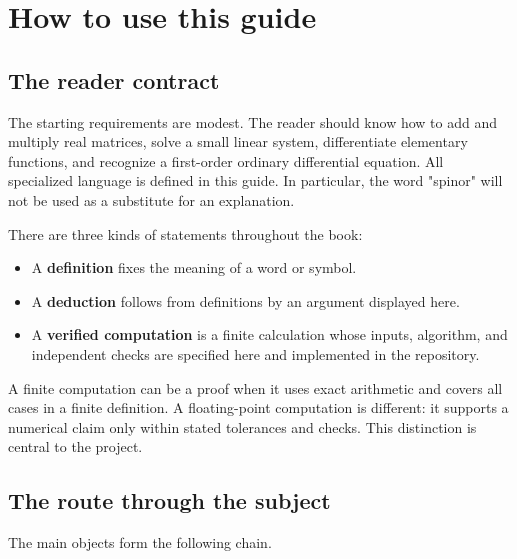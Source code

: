 \documentclass[11pt]{article}
\begin{document}
\section{How to use this guide}

\subsection{The reader contract}

The starting requirements are modest. The reader should know how to add and multiply real matrices, solve a small linear system, differentiate elementary functions, and recognize a first-order ordinary differential equation. All specialized language is defined in this guide. In particular, the word "spinor" will not be used as a substitute for an explanation.

There are three kinds of statements throughout the book:

\begin{itemize}
\item A \textbf{definition} fixes the meaning of a word or symbol.
\item A \textbf{deduction} follows from definitions by an argument displayed here.
\item A \textbf{verified computation} is a finite calculation whose inputs, algorithm,
and independent checks are specified here and implemented in the repository.

\end{itemize}

A finite computation can be a proof when it uses exact arithmetic and covers all cases in a finite definition. A floating-point computation is different: it supports a numerical claim only within stated tolerances and checks. This distinction is central to the project.

\subsection{The route through the subject}

The main objects form the following chain.
\end{document}
